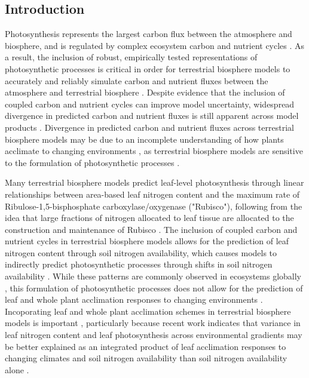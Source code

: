 \begin{singlespace}
    \chapter{\textbf{Introduction}}
\end{singlespace}

Photosynthesis represents the largest carbon flux between the atmosphere and biosphere, and is regulated by complex ecosystem carbon and nutrient cycles . As a result, the inclusion of robust, empirically tested representations of photosynthetic processes is critical in order for terrestrial biosphere models to accurately and reliably simulate carbon and nutrient fluxes between the atmosphere and terrestrial biosphere . Despite evidence that the inclusion of coupled carbon and nutrient cycles can improve model uncertainty, widespread divergence in predicted carbon and nutrient fluxes is still apparent across model products . Divergence in predicted carbon and nutrient fluxes across terrestrial biosphere models may be due to an incomplete understanding of how plants acclimate to changing environments , as terrestrial biosphere models are sensitive to the formulation of photosynthetic processes .

Many terrestrial biosphere models predict leaf-level photosynthesis through linear relationships between area-based leaf nitrogen content and the maximum rate of Ribulose-1,5-bisphosphate carboxylase/oxygenase ("Rubisco"), following from the idea that large fractions of nitrogen allocated to leaf tissue are allocated to the construction and maintenance of Rubisco . The inclusion of coupled carbon and nutrient cycles in terrestrial biosphere models  allows for the prediction of leaf nitrogen content through soil nitrogen availability, which causes models to indirectly predict photosynthetic processes through shifts in soil nitrogen availability . While these patterns are commonly observed in ecosystems globally , this formulation of photosynthetic processes does not allow for the prediction of leaf and whole plant acclimation responses to changing environments . Incoporating leaf and whole plant acclimation schemes in terrestrial biosphere models is important , particularly because recent work indicates that variance in leaf nitrogen content and leaf photosynthesis across environmental gradients may be better explained as an integrated product of leaf acclimation responses to changing climates and soil nitrogen availability than soil nitrogen availability alone .

